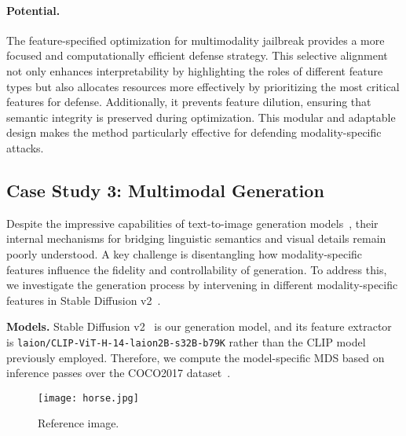 \paragraph{Potential.} The feature-specified optimization for multimodality jailbreak provides a more focused and computationally efficient defense strategy. This selective alignment not only enhances interpretability by highlighting the roles of different feature types but also allocates resources more effectively by prioritizing the most critical features for defense. Additionally, it prevents feature dilution, ensuring that semantic integrity is preserved during optimization. This modular and adaptable design makes the method particularly effective for defending modality-specific attacks.

\subsection{Case Study 3: Multimodal Generation}
Despite the impressive capabilities of text-to-image generation models~\citep{yu2024spae,koh2024generating,swamy2024multimodn}, their internal mechanisms for bridging linguistic semantics and visual details remain poorly understood. A key challenge is disentangling how modality-specific features influence the fidelity and controllability of generation. To address this, we investigate the generation process by intervening in different modality-specific features in Stable Diffusion v2~\citep{Rombach_2022_CVPR}.

\textbf{Models.} Stable Diffusion v2~\citep{Rombach_2022_CVPR} is our generation model, and its feature extractor is \texttt{laion/CLIP-ViT-H-14-laion2B-s32B-b79K} rather than the CLIP model previously employed. Therefore, we compute the model-specific MDS based on inference passes over the COCO2017 dataset~\citep{visualization-tools-for-coco-dataset}.
\begin{wrapfigure}{r}{0.42\linewidth}
    \centering 
    \texttt{[image: horse.jpg]}
    \caption{\footnotesize Reference image.}
    \label{fig:ref_image}
\end{wrapfigure}
\vspace{-3mm}

